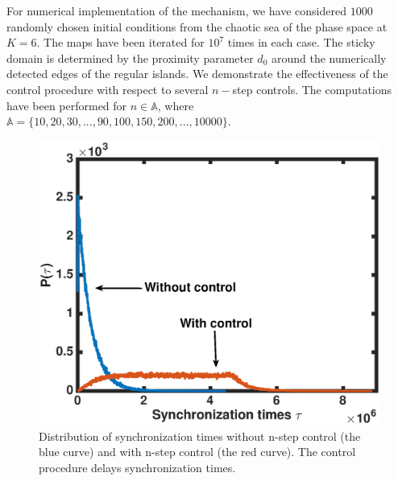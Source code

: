 \documentclass[reprint,amsmath,amssymb,aps,pre]{revtex4-1}
\begin{document}
For numerical implementation of the mechanism, we have considered $1000$ 
randomly chosen initial conditions from the chaotic sea of the phase space at 
$K = 6$. The maps have been iterated for $10^7$ times in each case.  The 
sticky domain is determined by the proximity parameter $d_0$ around the 
numerically detected edges of the regular islands. We demonstrate the 
effectiveness of the control procedure  with respect to several $n-$step 
controls. The computations have been performed for $n \in \mathbb{A}$, where 
$\mathbb{A} = \{10, 20,30,...,90, 100, 150,200, ... ,10 000\}$.  

\begin{figure}[t]
	\includegraphics[scale=0.42]{Sync_time_dist.eps}
	\caption{\label{fig:Sync_time_dist}\footnotesize Distribution of 
		synchronization times without n-step control (the blue curve) and with 
		n-step 
		control (the red curve). The control procedure delays synchronization times. }
\end{figure}
\end{document}
